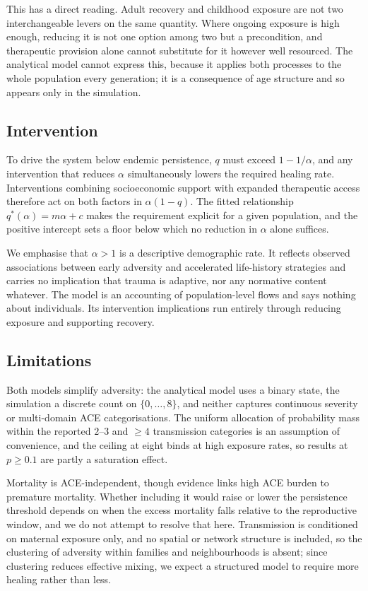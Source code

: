 \documentclass{article}
\begin{document}
This has a direct reading.  Adult recovery and childhood exposure are not two
interchangeable levers on the same quantity.  Where ongoing exposure is high
enough, reducing it is not one option among two but a precondition, and
therapeutic provision alone cannot substitute for it however well resourced.
The analytical model cannot express this, because it applies both processes to
the whole population every generation; it is a consequence of age structure and
so appears only in the simulation.

\subsection*{Intervention}

To drive the system below endemic persistence, \(q\) must exceed
\(1 - 1/\alpha\), and any intervention that reduces \(\alpha\) simultaneously
lowers the required healing rate.  Interventions combining socioeconomic
support with expanded therapeutic access therefore act on both factors in
\(\alpha(1-q)\).  The fitted relationship \(q^*(\alpha) = m\alpha + c\) makes
the requirement explicit for a given population, and the positive intercept
sets a floor below which no reduction in \(\alpha\) alone suffices.

We emphasise that \(\alpha > 1\) is a descriptive demographic rate.  It
reflects observed associations between early adversity and accelerated
life-history strategies \cite{ellis2009fundamental,williams2019adverse} and
carries no implication that trauma is adaptive, nor any normative content
whatever.  The model is an accounting of population-level flows and says
nothing about individuals.  Its intervention implications run entirely through
reducing exposure and supporting recovery.

\subsection*{Limitations}

Both models simplify adversity: the analytical model uses a binary state, the
simulation a discrete count on \(\{0,\dots,8\}\), and neither captures
continuous severity or multi-domain ACE categorisations.  The uniform
allocation of probability mass within the reported \(2\text{--}3\) and
\(\geq 4\) transmission categories is an assumption of convenience, and the
ceiling at eight binds at high exposure rates, so results at
\(p \geq 0.1\) are partly a saturation effect.

Mortality is ACE-independent, though evidence links high ACE burden to
premature mortality.  Whether including it would raise or lower the persistence
threshold depends on when the excess mortality falls relative to the
reproductive window, and we do not attempt to resolve that here.
Transmission is conditioned on maternal exposure only, and no spatial or
network structure is included, so the clustering of adversity within families
and neighbourhoods is absent; since clustering reduces effective mixing, we
expect a structured model to require more healing rather than less.
\end{document}
